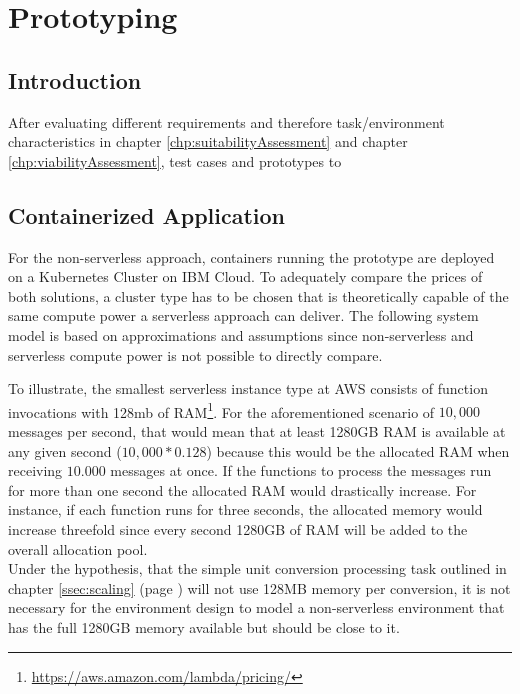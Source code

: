 \chapter{Prototyping}\label{chp:prototyping}


\section{Introduction}

After evaluating different requirements and therefore task/environment characteristics in chapter \ref{chp:suitabilityAssessment} and chapter \ref{chp:viabilityAssessment}, test cases and prototypes to 

\section{Containerized Application}


For the non-serverless approach, containers running the prototype are deployed on a Kubernetes Cluster on IBM Cloud. To adequately compare the prices of both solutions, a cluster type has to be chosen that is theoretically capable of the same compute power a serverless approach can deliver. The following system model is based on approximations and assumptions since non-serverless and serverless compute power is not possible to directly compare.

To illustrate, the smallest serverless instance type at AWS consists of function invocations with 128mb of RAM\footnote{\url{https://aws.amazon.com/lambda/pricing/}}. For the aforementioned scenario of $10,000$ messages per second, that would mean that at least 1280GB RAM is available at any given second (\(10,000 * 0.128\)) because this would be the allocated RAM when receiving $10.000$ messages at once. If the functions to process the messages run for more than one second the allocated RAM would drastically increase. For instance, if each function runs for three seconds, the allocated memory would increase threefold since every second 1280GB of RAM will be added to the overall allocation pool.\\
Under the hypothesis, that the simple unit conversion processing task outlined in chapter \ref{ssec:scaling} (page \pageref{ssec:scaling}) will not use 128MB memory per conversion, it is not necessary for the environment design to model a non-serverless environment that has the full 1280GB memory available but should be close to it. 

